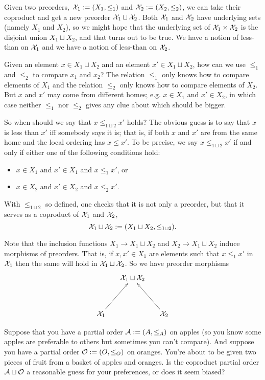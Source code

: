 \begin{example}

Given two preorders, $\mathcal{X}_1:=(X_1,\leq_1)$ and $\mathcal{X}_2:=(X_2,\leq_2)$, we can take their coproduct and get a new preorder $\mathcal{X}_1\sqcup\mathcal{X}_2$. Both $\mathcal{X}_1$ and $\mathcal{X}_2$ have underlying sets (namely $X_1$ and $X_2$), so we might hope that the underlying set of $\mathcal{X}_1\times\mathcal{X}_2$ is the disjoint union $X_1\sqcup X_2$, and that turns out to be true. We have a notion of less-than on $\mathcal{X}_1$ and we have a notion of less-than on $\mathcal{X}_2$. 

Given an element $x\in X_1\sqcup X_2$ and an element $x'\in X_1\sqcup X_2$, how can we use $\leq_1$ and $\leq_2$ to compare $x_1$ and $x_2$? The relation $\leq_1$ only knows how to compare elements of $X_1$ and the relation $\leq_2$ only knows how to compare elements of $X_2$. But $x$ and $x'$ may come from different homes; e.g. $x\in X_1$ and $x'\in X_2$, in which case neither $\leq_1$ nor $\leq_2$ gives any clue about which should be bigger. 

So when should we say that $x\leq_{1\sqcup 2} x'$ holds? The obvious guess is to say that $x$ is less than $x'$ iff somebody says it is; that is, if both $x$ and $x'$ are from the same home and the local ordering has $x\leq x'$. To be precise, we say $x\leq_{1\sqcup 2}x'$ if and only if either one of the following conditions hold:
\begin{itemize}
\item $x\in X_1$ and $x'\in X_1$ and $x\leq_1x'$, or
\item $x\in X_2$ and $x'\in X_2$ and $x\leq_2x'$.
\end{itemize}
With $\leq_{1\sqcup 2}$ so defined, one checks that it is not only a preorder, but that it serves as a coproduct of $\mathcal{X}_1$ and $\mathcal{X}_2$, 
$$\mathcal{X}_1\sqcup\mathcal{X}_2:=(X_1\sqcup X_2,\leq_{1\sqcup 2}).$$

Note that the inclusion functions $X_1\to X_1\sqcup X_2$ and $X_2\to X_1\sqcup X_2$ induce morphisms of preorders. That is, if $x,x'\in X_1$ are elements such that $x\leq_1x'$ in $\mathcal{X}_1$ then the same will hold in $\mathcal{X}_1\sqcup\mathcal{X}_2$. So we have preorder morphisms
$$\xymatrix@=15pt{&\mcX_1\sqcup\mcX_2\\\\\mcX_1\ar[ruu]&&\mcX_2\ar[luu]}$$

\end{example}

\begin{exercise}
Suppose that you have a partial order $\mathcal{A}:=(A,\leq_A)$ on apples (so you know some apples are preferable to others but sometimes you can't compare). And suppose you have a partial order $\mathcal{O}:=(O,\leq_O)$ on oranges. You're about to be given two pieces of fruit from a basket of apples and oranges. Is the coproduct partial order $\mathcal{A}\sqcup\mathcal{O}$ a reasonable guess for your preferences, or does it seem biased?
\end{exercise}

